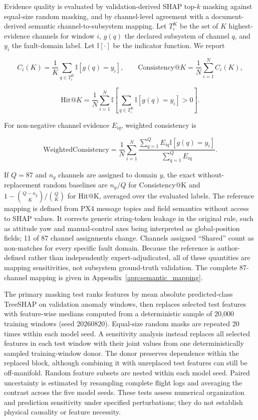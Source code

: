 Evidence quality is evaluated by validation-derived SHAP top-$k$ masking against equal-size random masking, and by channel-level agreement with a document-derived semantic channel-to-subsystem mapping. Let $T_i^{K}$ be the set of $K$ highest-evidence channels for window $i$, $g(q)$ the declared subsystem of channel $q$, and $y_i$ the fault-domain label. Let $\mathbb{I}[\cdot]$ be the indicator function. We report

\[
C_i(K)=\frac{1}{K}\sum_{q\in T_i^K}\mathbb{I}[g(q)=y_i],\qquad
\mathrm{Consistency@}K=\frac{1}{N}\sum_{i=1}^{N}C_i(K),
\]

\[
\mathrm{Hit@}K=\frac{1}{N}\sum_{i=1}^{N}
\mathbb{I}\!\left[\sum_{q\in T_i^K}\mathbb{I}[g(q)=y_i]>0\right].
\]

For non-negative channel evidence $E_{iq}$, weighted consistency is

\[
\mathrm{WeightedConsistency}=\frac{1}{N}\sum_{i=1}^{N}
\frac{\sum_{q=1}^{Q} E_{iq}\mathbb{I}[g(q)=y_i]}{\sum_{q=1}^{Q} E_{iq}}.
\]

If $Q=87$ and $n_y$ channels are assigned to domain $y$, the exact without-replacement random baselines are $n_y/Q$ for Consistency@K and $1-\binom{Q-n_y}{K}/\binom{Q}{K}$ for Hit@K, averaged over the evaluated labels. The reference mapping is defined from PX4 message topics and field semantics without access to SHAP values. It corrects generic string-token leakage in the original rule, such as attitude yaw and manual-control axes being interpreted as global-position fields; 11 of 87 channel assignments change. Channels assigned ``Shared'' count as non-matches for every specific fault domain. Because the reference is author-defined rather than independently expert-adjudicated, all of these quantities are mapping sensitivities, not subsystem ground-truth validation. The complete 87-channel mapping is given in Appendix~\ref{app:semantic_mapping}.

The primary masking test ranks features by mean absolute predicted-class TreeSHAP on validation anomaly windows, then replaces selected test features with feature-wise medians computed from a deterministic sample of 20,000 training windows (seed 20260820). Equal-size random masks are repeated 20 times within each model seed. A sensitivity analysis instead replaces all selected features in each test window with their joint values from one deterministically sampled training-window donor. The donor preserves dependence within the replaced block, although combining it with unreplaced test features can still be off-manifold. Random feature subsets are nested within each model seed. Paired uncertainty is estimated by resampling complete flight logs and averaging the contrast across the five model seeds. These tests assess numerical organization and prediction sensitivity under specified perturbations; they do not establish physical causality or feature necessity.
